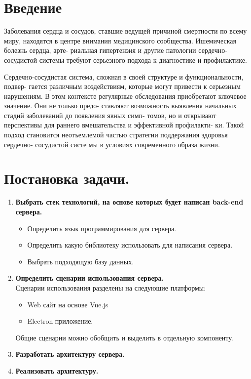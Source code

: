 \documentclass[12pt, russian]{extarticle}
\begin{document}
    \begin{spacing}{1.5}

    
    \tableofcontents
    \thispagestyle{empty}
    \newpage
    
    \pagestyle{plain}
    \setcounter{page}{3}

    \newpage
    \section{Введение}

    Заболевания сердца и сосудов, ставшие ведущей причиной смертности по всему миру,
находятся в центре внимания медицинского сообщества. Ишемическая болезнь сердца, арте-
риальная гипертензия и другие патологии сердечно-сосудистой системы требуют серьезного
подхода к диагностике и профилактике.

Сердечно-сосудистая система, сложная в своей структуре и функциональности, подвер-
гается различным воздействиям, которые могут привести к серьезным нарушениям. В этом
контексте регулярные обследования приобретают ключевое значение. Они не только предо-
ставляют возможность выявления начальных стадий заболеваний до появления явных симп-
томов, но и открывают перспективы для раннего вмешательства и эффективной профилакти-
ки. Такой подход становится неотъемлемой частью стратегии поддержания здоровья сердечно-
сосудистой систе
мы в условиях современного образа жизни.

    \newpage
    \section{Постановка задачи.}

    \begin{enumerate}
        \item \textbf{Выбрать стек технологий, на основе которых будет написан back-end сервера.}
            \begin{itemize}
                \item Определить язык программирования для сервера.
                \item Определить какую библиотеку использовать для написания сервера.
                \item Выбрать подходящую базу данных.
            \end{itemize}
        \item \textbf{Определить сценарии использования сервера.} \\
            Сценарии использования разделены на следующие платформы:
            \begin{itemize}
                \item Web сайт на основе Vue.js
                \item Electron приложение.
            \end{itemize}
            Общие сценарии можно обобщить и выделить в отдельную компоненту.
        \item \textbf{Разработать архитектуру сервера.}
        \item \textbf{Реализовать архитектуру.}
    \end{enumerate}


\end{spacing}
\end{document}
